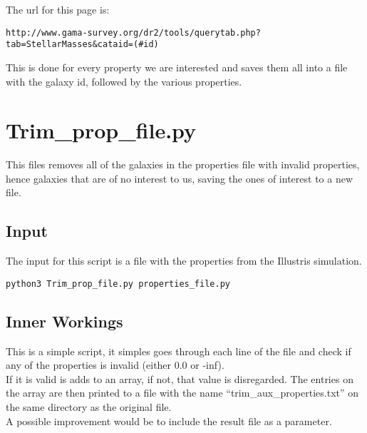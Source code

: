 \documentclass[11pt]{article}
\begin{document}
The url for this page is:

\begin{verbatim}
http://www.gama-survey.org/dr2/tools/querytab.php?tab=StellarMasses&cataid=(#id)
\end{verbatim}

This is done for every property we are interested and saves them all into a file with the galaxy id, followed by the various properties.

\newpage


\section{Trim\_prop\_file.py}

This files removes all of the galaxies in the properties file with invalid properties, hence galaxies that are of no interest to us, saving the ones of interest to a new file.

\subsection{Input}

The input for this script is a file with the properties from the Illustris simulation.

\begin{verbatim}
python3 Trim_prop_file.py properties_file.py
\end{verbatim}

\subsection{ Inner Workings}

This is a simple script, it simples goes through each line of the file and check if any of the properties is invalid (either 0.0 or -inf).\\

If it is valid is adds to an array, if not, that value is disregarded. The entries on the array are then printed to a file with the name ``trim\_aux\_properties.txt'' on the same directory as the original file.\\

A possible improvement would be to include the result file as a parameter.
\end{document}
